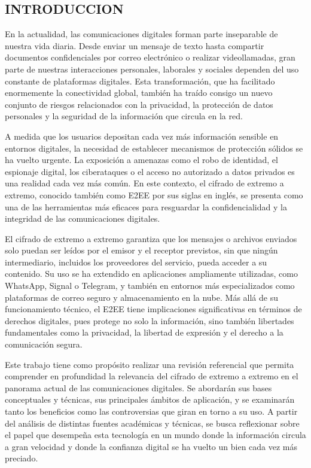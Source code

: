 \documentclass[spanish,12pt,a4paper]{article}
\begin{document}
\begin{multicols}{2}
		\section*{\normalsize INTRODUCCION}
		En la actualidad, las comunicaciones digitales forman parte inseparable de nuestra vida diaria. Desde enviar un mensaje de texto hasta compartir documentos confidenciales por correo electrónico o realizar videollamadas, gran parte de nuestras interacciones personales, laborales y sociales dependen del uso constante de plataformas digitales. Esta transformación, que ha facilitado enormemente la conectividad global, también ha traído consigo un nuevo conjunto de riesgos relacionados con la privacidad, la protección de datos personales y la seguridad de la información que circula en la red.
		
		A medida que los usuarios depositan cada vez más información sensible en entornos digitales, la necesidad de establecer mecanismos de protección sólidos se ha vuelto urgente. La exposición a amenazas como el robo de identidad, el espionaje digital, los ciberataques o el acceso no autorizado a datos privados es una realidad cada vez más común. En este contexto, el cifrado de extremo a extremo, conocido también como E2EE por sus siglas en inglés, se presenta como una de las herramientas más eficaces para resguardar la confidencialidad y la integridad de las comunicaciones digitales.
		
		El cifrado de extremo a extremo garantiza que los mensajes o archivos enviados solo puedan ser leídos por el emisor y el receptor previstos, sin que ningún intermediario, incluidos los proveedores del servicio, pueda acceder a su contenido. Su uso se ha extendido en aplicaciones ampliamente utilizadas, como WhatsApp, Signal o Telegram, y también en entornos más especializados como plataformas de correo seguro y almacenamiento en la nube. Más allá de su funcionamiento técnico, el E2EE tiene implicaciones significativas en términos de derechos digitales, pues protege no solo la información, sino también libertades fundamentales como la privacidad, la libertad de expresión y el derecho a la comunicación segura.
		
		Este trabajo tiene como propósito realizar una revisión referencial que permita comprender en profundidad la relevancia del cifrado de extremo a extremo en el panorama actual de las comunicaciones digitales. Se abordarán sus bases conceptuales y técnicas, sus principales ámbitos de aplicación, y se examinarán tanto los beneficios como las controversias que giran en torno a su uso. A partir del análisis de distintas fuentes académicas y técnicas, se busca reflexionar sobre el papel que desempeña esta tecnología en un mundo donde la información circula a gran velocidad y donde la confianza digital se ha vuelto un bien cada vez más preciado.

	\end{multicols}
	
	
	
	\printbibliography
	
\end{document}

